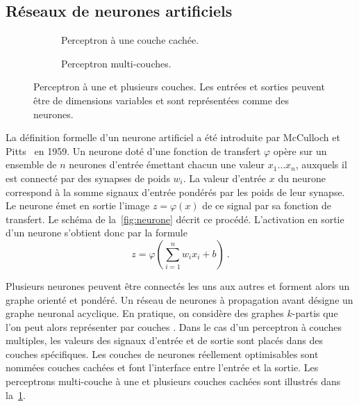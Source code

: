 \subsection{Réseaux de neurones artificiels}

\begin{figure}[t]
  \begin{subfigure}[b]{0.5\textwidth}
    \resizebox{\textwidth}{!}{
    
    }
  \caption{Perceptron à une couche cachée.}
  \end{subfigure}%
  \begin{subfigure}[b]{0.5\textwidth}
    \resizebox{\textwidth}{!}{
    
    }
  \caption{Perceptron multi-couches.}
  \end{subfigure}
  \caption{Perceptron à une et plusieurs couches. Les entrées et sorties peuvent être de dimensions variables et sont représentées comme des neurones.}
  \label{fig:perceptron}
\end{figure}

La définition formelle d'un neurone artificiel a été introduite par McCulloch et Pitts~\cite{lettvin_what_1959} en 1959. Un neurone doté d'une fonction de transfert $\varphi$ opère sur un ensemble de $n$ neurones d'entrée émettant chacun une valeur $x_1\dots{}x_n$, auxquels il est connecté par des synapses de poids $w_i$. La valeur d'entrée $x$ du neurone correspond à la somme signaux d'entrée pondérés par les poids de leur synapse. Le neurone émet en sortie l'image $z = \varphi(x)$ de ce signal par sa fonction de transfert. Le schéma de la~\cref{fig:neurone} décrit ce procédé. L'activation en sortie d'un neurone s'obtient donc par la formule
\begin{equation}
z = \varphi\left(\sum_{i=1}^n w_i x_i + b\right)~.
\end{equation}

Plusieurs neurones peuvent être connectés les uns aux autres et forment alors un graphe orienté et pondéré. Un réseau de neurones à propagation avant désigne un graphe neuronal acyclique. En pratique, on considère des graphes $k$-partis que l'on peut alors représenter par \og couches \fg. Dans le cas d'un perceptron à couches multiples, les valeurs des signaux d'entrée et de sortie sont placés dans des couches spécifiques. Les couches de neurones réellement optimisables sont nommées \og couches cachées \fg{} et font l'interface entre l'entrée et la sortie. Les perceptrons multi-couche à une et plusieurs couches cachées sont illustrés dans la~\cref{fig:perceptron}.

